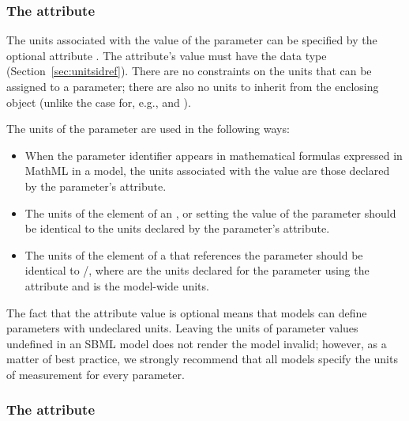 \subsubsection{The  attribute}
\label{sec:parameter-units}

The units associated with the value of the parameter can be
specified by the optional attribute .  The
attribute's value must have the data type 
(Section~\ref{sec:unitsidref}).  There are no constraints on the
units that can be assigned to a parameter; there are also no units
to inherit from the enclosing \Model object (unlike the case for,
e.g., \Species and \Compartment).

The units of the parameter are used in the following ways:
\begin{itemize}

\item When the parameter identifier appears in mathematical
  formulas expressed in MathML in a model, the units associated
  with the value are those declared by the parameter's
   attribute.

\item The units of the  element of an \AssignmentRule,
  \InitialAssignment or \EventAssignment setting the value of the
  parameter should be identical to the units declared by the
  parameter's  attribute.

\item The units of the  element of a \RateRule that
  references the parameter should be identical to /, where  are
  the units declared for the parameter using the 
  attribute and  is the model-wide 
  units.

\end{itemize}

The fact that the  attribute value is optional means
that models can define parameters with undeclared units.  Leaving
the units of parameter values undefined in an SBML model does not
render the model invalid; however, as a matter of best practice,
we strongly recommend that all models specify the units of
measurement for every parameter.


\subsubsection{The  attribute}
\label{sec:parameter-constant}


